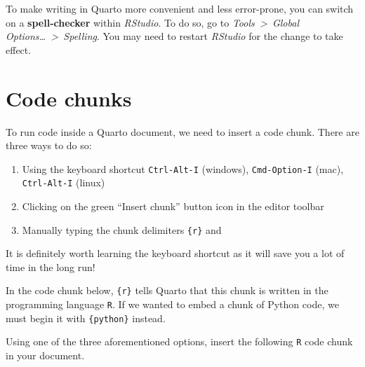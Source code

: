 \documentclass[
  letterpaper,
  DIV=11,
  numbers=noendperiod]{scrreprt}
\providecommand{\tightlist}{%
  \setlength{\itemsep}{0pt}\setlength{\parskip}{0pt}}
\begin{document}
\begin{tcolorbox}[enhanced jigsaw, arc=.35mm, bottomrule=.15mm, bottomtitle=1mm, breakable, colback=white, colbacktitle=quarto-callout-tip-color!10!white, colframe=quarto-callout-tip-color-frame, coltitle=black, left=2mm, leftrule=.75mm, opacityback=0, opacitybacktitle=0.6, rightrule=.15mm, title=\textcolor{quarto-callout-tip-color}{\faLightbulb}\hspace{0.5em}{Don't let typos ruin your Quarto flow!~\emoji{zap}}, titlerule=0mm, toprule=.15mm, toptitle=1mm]

To make writing in Quarto more convenient and less error-prone, you can
switch on a \textbf{spell-checker} within \emph{RStudio}. To do so, go
to \emph{Tools~\textgreater~Global Options\ldots~\textgreater~Spelling}.
You may need to restart \emph{RStudio} for the change to take effect.

\end{tcolorbox}

\section{Code chunks}\label{sec-Chunks}

To run code inside a Quarto document, we need to insert a code chunk.
There are three ways to do so:

\begin{enumerate}
\def\labelenumi{\arabic{enumi}.}
\tightlist
\item
  Using the keyboard shortcut
  \texttt{Ctrl-Alt-I} (windows), \texttt{Cmd-Option-I} (mac), \texttt{Ctrl-Alt-I} (linux)
\item
  Clicking on the green ``Insert chunk'' button icon in the editor
  toolbar
\item
  Manually typing the chunk delimiters
  \texttt{\textasciigrave{}\textasciigrave{}\textasciigrave{}\{r\}} and
  \texttt{\textasciigrave{}\textasciigrave{}\textasciigrave{}}
\end{enumerate}

It is definitely worth learning the keyboard shortcut as it will save
you a lot of time in the long run!

In the code chunk below, \texttt{\{r\}} tells Quarto that this chunk is
written in the programming language \texttt{R}. If we wanted to embed a
chunk of Python code, we must begin it with
\texttt{\textasciigrave{}\textasciigrave{}\textasciigrave{}\{python\}}
instead.

Using one of the three aforementioned options, insert the following
\texttt{R} code chunk in your document.
\end{document}
